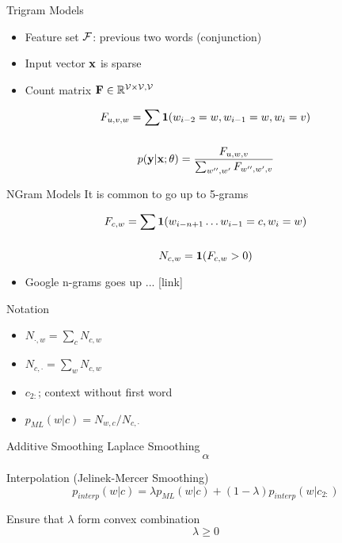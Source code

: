 \documentclass{beamer}
\begin{document}
\begin{frame}{Trigram Models}
  \begin{itemize}
  \item Feature set $\mathcal{F}$: previous two words (conjunction)
  \item Input vector $\mathbf{x}$ is sparse
  \item Count matrix $\mathbf{F} \in \mathbb{R}^{\mathcal{V} \times \mathcal{V}, \mathcal{V}} $
  \end{itemize}

  \[ F_{u, v, w}  = \sum_{} \mathbf{1}(w_{i-2} = w, w_{i-1} = w, w_i = v)  \]

  \[p(\mathbf{y} | \mathbf{x};\theta) = \frac{F_{u, w, v}}{\sum_{w'', w'} F_{w'', w',v}} \]
\end{frame}


\begin{frame}{NGram Models}
  It is common to go up to 5-grams

  \[ F_{c, w}  =  \sum_{} \mathbf{1}(w_{i-n+1} \ldots w_{i-1} = c, w_{i} = w)  \]

  \[ N_{c, w}  =  \mathbf{1}(F_{c,w} > 0)  \]


  \begin{itemize}
  \item Google n-grams goes up ... [link]
  \end{itemize}
\end{frame}

\begin{frame}{Notation}
  \begin{itemize}
  \item $N_{\cdot, w} = \sum_c N_{c,w} $
  \item $N_{c, \cdot} = \sum_w N_{c,w} $
  \item $c_{2:}$; context without first word
  \item $p_{ML}(w | c) = N_{w, c} / N_{c, \cdot}$
  \end{itemize}
\end{frame}

\begin{frame}{Additive Smoothing}
  Laplace Smoothing
  \[\alpha \]
\end{frame}

\begin{frame}{Interpolation (Jelinek-Mercer Smoothing)}
  \[ p_{interp}(w |  c) =  \lambda p_{ML}(w |  c) + (1 - \lambda) p_{interp}(w | c_{2:}) \]

  Ensure that $\lambda$ form convex combination
  \[\lambda \geq 0\]

\end{frame}
\end{document}
